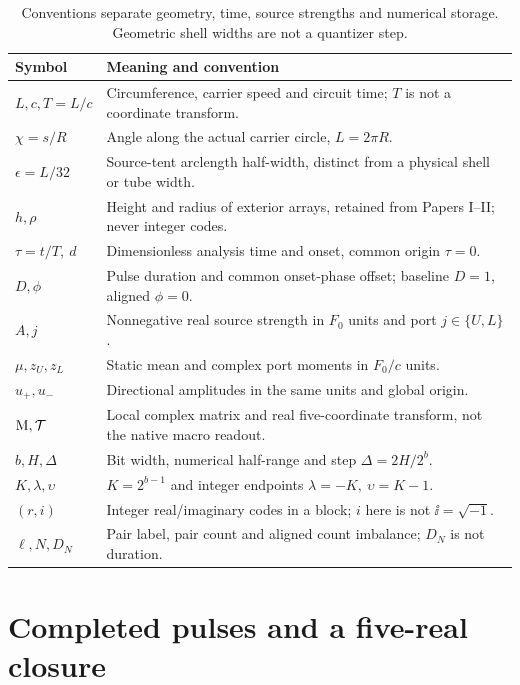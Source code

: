 \begin{table}[ht]
\centering\small
\begin{tabular}{P{30mm}P{119mm}}\toprule
Symbol & Meaning and convention\\\midrule
$L,c,T=L/c$ & Circumference, carrier speed and circuit time; $T$ is not a coordinate transform.\\
$\chi=s/R$ & Angle along the actual carrier circle, $L=2\pi R$.\\
$\epsilon=L/32$ & Source-tent arclength half-width, distinct from a physical shell or tube width.\\
$h,\rho$ & Height and radius of exterior arrays, retained from Papers I--II; never integer codes.\\
$\tau=t/T,\ d$ & Dimensionless analysis time and onset, common origin $\tau=0$.\\
$D,\phi$ & Pulse duration and common onset-phase offset; baseline $D=1$, aligned $\phi=0$.\\
$A,j$ & Nonnegative real source strength in $F_0$ units and port $j\in\{U,L\}$.\\
$\mu,z_U,z_L$ & Static mean and complex port moments in $F_0/c$ units.\\
$u_+,u_-$ & Directional amplitudes in the same units and global origin.\\
$\mathrm M,\mathcal T$ & Local complex matrix and real five-coordinate transform, not the native macro readout.\\
$b,H,\Delta$ & Bit width, numerical half-range and step $\Delta=2H/2^b$.\\
$K,\lambda,\upsilon$ & $K=2^{b-1}$ and integer endpoints $\lambda=-K,\ \upsilon=K-1$.\\
$(r,i)$ & Integer real/imaginary codes in a block; $i$ here is not $\ii=\sqrt{-1}$.\\
$\ell,N,D_N$ & Pair label, pair count and aligned count imbalance; $D_N$ is not duration.\\\bottomrule
\end{tabular}
\caption{Conventions separate geometry, time, source strengths and numerical storage. Geometric shell widths are not a quantizer step.}
\label{tab:conventions}
\end{table}

\section{Completed pulses and a five-real closure}\label{sec:closure}
